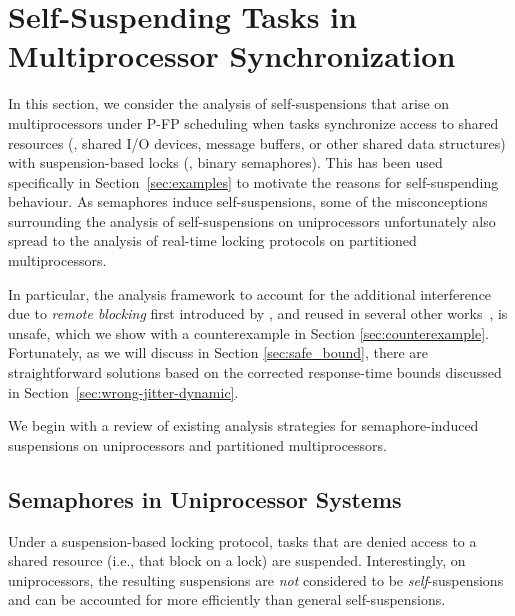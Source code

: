 \section{Self-Suspending Tasks in Multiprocessor Synchronization}
\label{sec:syn}

In this section, we consider the analysis of self-suspensions that arise on multiprocessors under P-FP scheduling when tasks synchronize access to shared resources (\eg, shared I/O devices, message buffers, or other shared data structures) with suspension-based locks (\eg, binary semaphores). This has been used specifically in Section~\ref{sec:examples} to motivate the reasons for self-suspending behaviour. 
As semaphores induce self-suspensions, some of the misconceptions surrounding the analysis of self-suspensions on uniprocessors unfortunately also spread to the analysis of  real-time locking protocols on partitioned multiprocessors.

In particular, the analysis framework to account for the additional interference due to \emph{remote blocking} first introduced by \cite{lakshmanan-2009}, and reused in several other works~\cite{zeng-2011,bbb-2013,yang-2013,kim-2014,han-2014,carminati-2014,yang-2014},  is unsafe, which we show with a counterexample in Section \ref{sec:counterexample}. Fortunately, as we will discuss in Section \ref{sec:safe_bound}, there are straightforward solutions based on the corrected response-time bounds discussed in Section~\ref{sec:wrong-jitter-dynamic}.

We begin with a review of existing analysis strategies for semaphore-induced suspensions on uniprocessors and partitioned multiprocessors. 
 

\subsection{Semaphores in Uniprocessor Systems}
\label{sec:sem-uni}

Under a suspension-based locking protocol, tasks that are denied access to a shared resource (i.e., that block on a lock) are suspended. Interestingly, on uniprocessors, the resulting suspensions are \emph{not} considered to be \emph{self}-suspensions and can be accounted for more efficiently than general self-suspensions.

